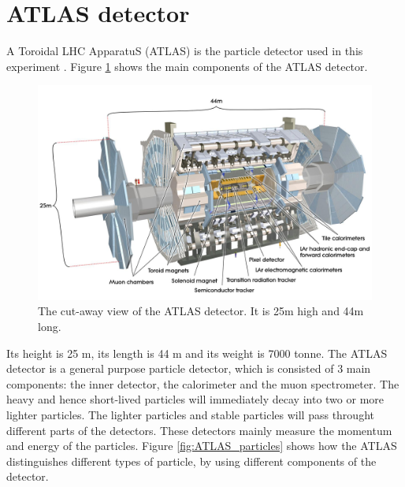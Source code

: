 \section{ATLAS detector}
\label{sec:detector_ATLAS}

A Toroidal LHC ApparatuS (ATLAS) is the particle detector used in this experiment \cite{ATLAS_doc}.
Figure \ref{fig:detector_ATLAS} shows the main components of the ATLAS detector.
\begin{figure}
\centering
\includegraphics[width=\textwidth]{data/photo/detector/ATLAS.jpg}
\caption{The cut-away view of the ATLAS detector. It is 25m high and 44m long. \cite{ATLAS_photo}}
\label{fig:detector_ATLAS}
\end{figure}
Its height is 25 m, its length is 44 m and its weight is 7000 tonne.
The ATLAS detector is a general purpose particle detector, which is consisted of 3 main components: the inner detector, the calorimeter and the muon spectrometer.
The heavy and hence short-lived particles will immediately decay into two or more lighter particles.
The lighter particles and stable particles will pass throught different parts of the detectors.
These detectors mainly measure the momentum and energy of the particles.
Figure \ref{fig:ATLAS_particles} shows how the ATLAS distinguishes different types of particle, by using different components of the detector.

